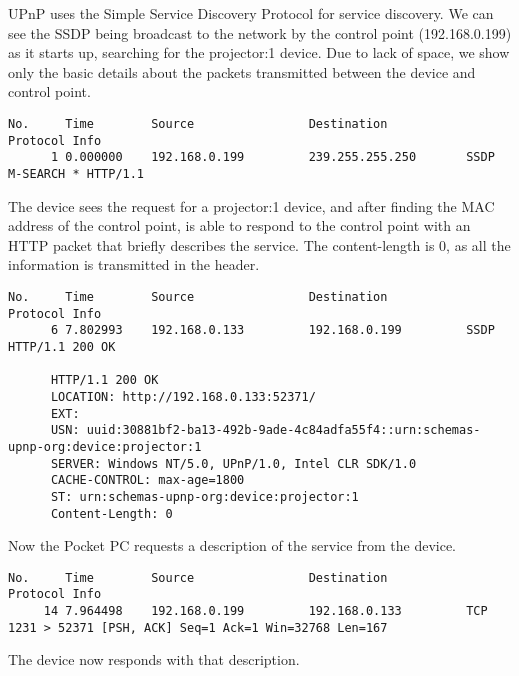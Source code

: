 \documentclass[11pt]{report}
\begin{document}
UPnP uses the Simple Service Discovery Protocol for service discovery. We can see the SSDP being broadcast to the network by the control point (192.168.0.199) as it starts up, searching for the projector:1 device. Due to lack of space, we show only the basic details about the packets transmitted between the device and control point.

\begin{verbatim}
No.     Time        Source                Destination           Protocol Info
      1 0.000000    192.168.0.199         239.255.255.250       SSDP     M-SEARCH * HTTP/1.1
\end{verbatim}

The device sees the request for a projector:1 device, and after finding the MAC address of the control point, is able to respond to the control point with an HTTP packet that briefly describes the service. The content-length is 0, as all the information is transmitted in the header.

\begin{verbatim}
No.     Time        Source                Destination           Protocol Info
      6 7.802993    192.168.0.133         192.168.0.199         SSDP     HTTP/1.1 200 OK

      HTTP/1.1 200 OK
      LOCATION: http://192.168.0.133:52371/
      EXT: 
      USN: uuid:30881bf2-ba13-492b-9ade-4c84adfa55f4::urn:schemas-upnp-org:device:projector:1
      SERVER: Windows NT/5.0, UPnP/1.0, Intel CLR SDK/1.0
      CACHE-CONTROL: max-age=1800
      ST: urn:schemas-upnp-org:device:projector:1
      Content-Length: 0
\end{verbatim}

Now the Pocket PC requests a description of the service from the device.

\begin{verbatim}
No.     Time        Source                Destination           Protocol Info
     14 7.964498    192.168.0.199         192.168.0.133         TCP      1231 > 52371 [PSH, ACK] Seq=1 Ack=1 Win=32768 Len=167
\end{verbatim}

The device now responds with that description.
\end{document}
